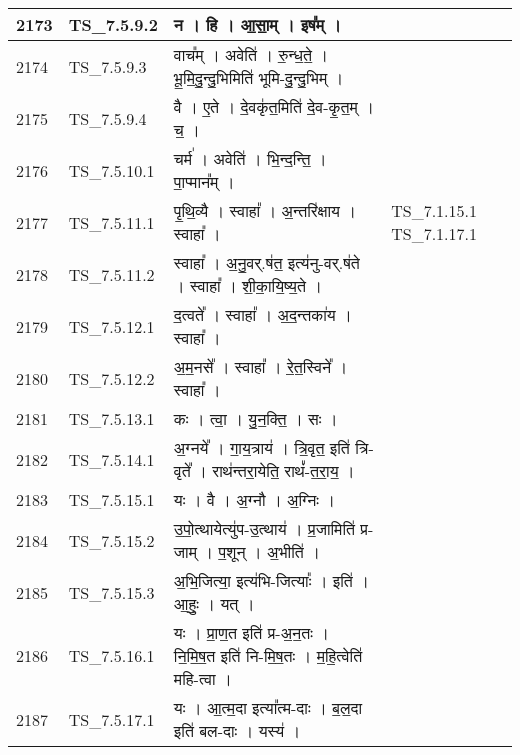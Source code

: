 \documentclass[17pt]{extarticle}
\begin{document}
\begin{longtable}{||p{0.4in}||p{0.9in}||p{4.0in}||p{0.9in}||}
        \hline
            2173 & TS\_7.5.9.2 & न   ।   हि   ।   आ॒सा॒म्   ।   इष᳚म्   ।    &      \\
        \hline
            2174 & TS\_7.5.9.3 & वाच᳚म्   ।   अवेति॑   ।   रु॒न्ध॒ते॒   ।   भू॒मि॒दु॒न्दु॒भिमिति॑ भूमि{-}दु॒न्दु॒भिम्   ।    &      \\
        \hline
            2175 & TS\_7.5.9.4 & वै   ।   ए॒ते   ।   दे॒वकृ॑त॒मिति॑ दे॒व{-}कृ॒त॒म्   ।   च॒   ।    &      \\
        \hline
            2176 & TS\_7.5.10.1 & चर्म॑   ।   अवेति॑   ।   भि॒न्द॒न्ति॒   ।   पा॒प्मान᳚म्   ।    &      \\
        \hline
            2177 & TS\_7.5.11.1 & पृ॒थि॒व्यै   ।   स्वाहा᳚   ।   अ॒न्तरि॑क्षाय   ।   स्वाहा᳚   ।    & TS\_7.1.15.1 TS\_7.1.17.1        \\
        \hline
            2178 & TS\_7.5.11.2 & स्वाहा᳚   ।   अ॒नु॒वर्.ष॑त॒ इत्य॑नु{-}वर्.ष॑ते   ।   स्वाहा᳚   ।   शी॒का॒यि॒ष्य॒ते   ।    &      \\
        \hline
            2179 & TS\_7.5.12.1 & द॒त्वते᳚   ।   स्वाहा᳚   ।   अ॒द॒न्तका॑य   ।   स्वाहा᳚   ।    &      \\
        \hline
            2180 & TS\_7.5.12.2 & अ॒म॒नसे᳚   ।   स्वाहा᳚   ।   रे॒त॒स्विने᳚   ।   स्वाहा᳚   ।    &      \\
        \hline
            2181 & TS\_7.5.13.1 & कः   ।   त्वा॒   ।   यु॒न॒क्ति॒   ।   सः   ।    &      \\
        \hline
            2182 & TS\_7.5.14.1 & अ॒ग्नये᳚   ।   गा॒य॒त्राय॑   ।   त्रि॒वृत॒ इति॑ त्रि{-}वृते᳚   ।   राथ॑न्तरा॒येति॒ राथं᳚{-}त॒रा॒य॒   ।    &      \\
        \hline
            2183 & TS\_7.5.15.1 & यः   ।   वै   ।   अ॒ग्नौ   ।   अ॒ग्निः   ।    &      \\
        \hline
            2184 & TS\_7.5.15.2 & उ॒पो॒त्थायेत्यु॑प{-}उ॒त्थाय॑   ।   प्र॒जामिति॑ प्र{-}जाम्   ।   प॒शून्   ।   अ॒भीति॑   ।    &      \\
        \hline
            2185 & TS\_7.5.15.3 & अ॒भि॒जित्या॒ इत्य॑भि{-}जित्याः᳚   ।   इति॑   ।   आ॒हुः॒   ।   यत्   ।    &      \\
        \hline
            2186 & TS\_7.5.16.1 & यः   ।   प्रा॒ण॒त इति॑ प्र{-}अ॒न॒तः   ।   नि॒मि॒ष॒त इति॑ नि{-}मि॒ष॒तः   ।   म॒हि॒त्वेति॑ महि{-}त्वा   ।    &      \\
        \hline
            2187 & TS\_7.5.17.1 & यः   ।   आ॒त्म॒दा इत्या᳚त्म{-}दाः   ।   ब॒ल॒दा इति॑ बल{-}दाः   ।   यस्य॑   ।    &      \\

\end{longtable}
\end{document}
